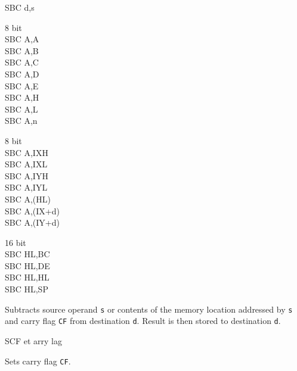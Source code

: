 \begin{basedescript}{
	\desclabelstyle{\multilinelabel}
	\desclabelwidth{3cm}}
\begin{DetailItem}{SBC d,s}
		\begin{DetailVariants}
			\textnormal{8 bit}\\
			SBC A,A\\
			SBC A,B\\
			SBC A,C\\
			SBC A,D\\
			SBC A,E\\
			SBC A,H\\
			SBC A,L\\
			SBC A,n

			\columnbreak
			\textnormal{8 bit}\\
			SBC A,IXH\UNDOC\\
			SBC A,IXL\UNDOC\\
			SBC A,IYH\UNDOC\\
			SBC A,IYL\UNDOC\\
			SBC A,(HL)\\
			SBC A,(IX+d)\\
			SBC A,(IY+d)

			\columnbreak
			\textnormal{16 bit}\\
			SBC HL,BC\\
			SBC HL,DE\\
			SBC HL,HL\\
			SBC HL,SP
		\end{DetailVariants}
		
		Subtracts source operand {\tt s} or contents of the memory location addressed by {\tt s} and carry flag {\tt CF} from destination {\tt d}. Result is then stored to destination {\tt d}.

		\begin{DetailEffects}[v]
			\FlagsSBCr[8-bit]
			\FlagsSBCrr[16-bit]
		\end{DetailEffects}
						
		\begin{DetailTiming}
		\end{DetailTiming}

	\end{DetailItem}

	\begin{DetailItem}{SCF}
		{et arry lag}
		{\SymSCF}

		Sets carry flag {\tt CF}.


\end{DetailItem}
\end{basedescript}

